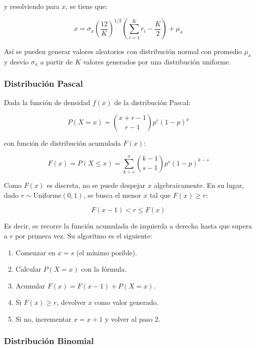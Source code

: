 \documentclass{article}
\begin{document}
y resolviendo para $x$, se tiene que:

\begin{equation}
    x = \sigma_x \left(\frac{12}{K}\right)^{1/2} \!\left(\sum_{i=1}^{K} r_i - \frac{K}{2}\right) + \mu_x
\end{equation}

Así se pueden generar valores aleatorios con distribución normal con promedio $\mu_x$ y
desvío $\sigma_x$ a partir de $K$ valores generados por una distribución uniforme.


\subsubsection{Distribución Pascal}

Dada la función de densidad $f(x)$ de la distribución Pascal:

\begin{equation}
    P(X = x) = \binom{x + r - 1}{r - 1} p^r (1-p)^x
\end{equation}

con función de distribución acumulada $F(x)$:

\begin{equation}
    F(x) = P(X \leq x) = \sum_{k=s}^{x} \binom{k - 1}{s - 1} p^s (1-p)^{k-s}
\end{equation}

Como $F(x)$ es discreta, no se puede despejar $x$ algebraicamente. En su lugar, dado
$r \sim \mathrm{Uniforme}(0,1)$, se busca el menor $x$ tal que $F(x) \geq r$:

\begin{equation}
    F(x-1) < r \leq F(x)
\end{equation}

Es decir, se recorre la función acumulada de izquierda a derecha hasta que supera a $r$ por
primera vez. Su algoritmo es el siguiente:

\begin{enumerate}
    \item Comenzar en $x = s$ (el mínimo posible).
    \item Calcular $P(X = x)$ con la fórmula.
    \item Acumular $F(x) = F(x-1) + P(X = x)$.
    \item Si $F(x) \geq r$, devolver $x$ como valor generado.
    \item Si no, incrementar $x = x + 1$ y volver al paso 2.
\end{enumerate}


\subsubsection{Distribución Binomial}
\end{document}
